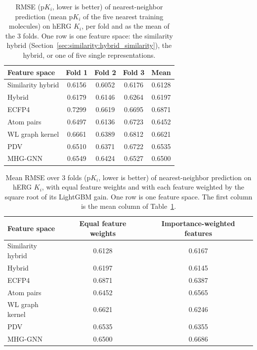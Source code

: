 \begin{table}[htbp]
\centering
\small
\begin{tabular}{@{}lcccc@{}}
\toprule
Feature space & Fold 1 & Fold 2 & Fold 3 & Mean \\
\midrule
Similarity hybrid & 0.6156 & 0.6052 & 0.6176 & 0.6128 \\
Hybrid & 0.6179 & 0.6146 & 0.6264 & 0.6197 \\
ECFP4 & 0.7299 & 0.6619 & 0.6695 & 0.6871 \\
Atom pairs & 0.6497 & 0.6136 & 0.6723 & 0.6452 \\
WL graph kernel & 0.6661 & 0.6389 & 0.6812 & 0.6621 \\
PDV & 0.6510 & 0.6371 & 0.6722 & 0.6535 \\
MHG-GNN & 0.6549 & 0.6424 & 0.6527 & 0.6500 \\
\bottomrule
\end{tabular}
\caption[Nearest-neighbor prediction on hERG $K_i$]{RMSE (p$K_i$, lower is better) of nearest-neighbor prediction (mean p$K_i$ of the five nearest training molecules) on hERG $K_i$, per fold and as the mean of the 3 folds. One row is one feature space: the similarity hybrid (Section~\ref{sec:similarity:hybrid_similarity}), the hybrid, or one of five single representations.}
\label{tab:ch6prelim_knn}
\end{table}

\begin{table}[htbp]
\centering
\small
\begin{tabular}{@{}lcc@{}}
\toprule
Feature space & Equal feature weights & Importance-weighted features \\
\midrule
Similarity hybrid & 0.6128 & 0.6167 \\
Hybrid & 0.6197 & 0.6145 \\
ECFP4 & 0.6871 & 0.6387 \\
Atom pairs & 0.6452 & 0.6565 \\
WL graph kernel & 0.6621 & 0.6246 \\
PDV & 0.6535 & 0.6355 \\
MHG-GNN & 0.6500 & 0.6686 \\
\bottomrule
\end{tabular}
\caption[Nearest-neighbor prediction on hERG $K_i$ with importance weighting]{Mean RMSE over 3 folds (p$K_i$, lower is better) of nearest-neighbor prediction on hERG $K_i$, with equal feature weights and with each feature weighted by the square root of its LightGBM gain. One row is one feature space. The first column is the mean column of Table~\ref{tab:ch6prelim_knn}.}
\label{tab:ch6prelim_knn_weighted}
\end{table}

